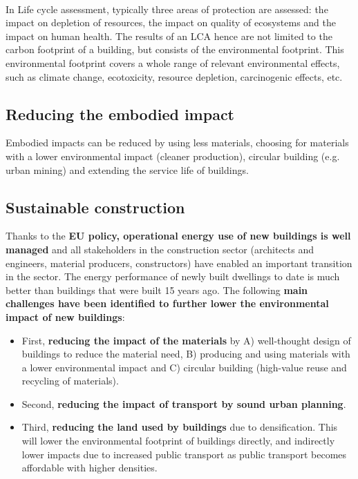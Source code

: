\documentclass[../summary.tex]{subfiles}
\begin{document}
	\ \\
	In Life cycle assessment, typically three areas of protection are assessed: the impact on depletion of resources, the impact on quality of ecosystems and the impact on human health. The results of an LCA hence are not limited to the carbon footprint of a building, but consists of the environmental footprint. This environmental footprint covers a whole range of relevant environmental effects, such as climate change, ecotoxicity, resource depletion, carcinogenic effects, etc.
	
	\subsection{Reducing the embodied impact}
	
	Embodied impacts can be reduced by using less materials, choosing for materials with a lower environmental impact (cleaner production),
	circular building (e.g. urban mining) and extending the service life of buildings.
	\newpage
	\subsection{Sustainable construction}
	
	Thanks to the \textbf{EU policy, operational energy use of new buildings is well managed} and all stakeholders in the construction sector (architects and engineers, material producers, constructors) have enabled an important transition in the sector. The energy performance of newly built dwellings to date is much better than buildings that were built 15 years ago. The following \textbf{main challenges have been identified to further lower the environmental impact of new buildings}:
	\begin{itemize}
		\item First, \textbf{reducing the impact of the materials} by A) well-thought design of buildings to reduce the material need, B) producing and using materials with a lower environmental impact and C) circular building (high-value reuse and recycling of materials).
		\item Second, \textbf{reducing the impact of transport by sound urban planning}.
		\item Third, \textbf{reducing the land used by buildings} due to densification. This will lower the environmental footprint of buildings directly, and indirectly lower impacts due to increased public transport as public transport becomes affordable with higher densities.
	\end{itemize}
	
\end{document}
